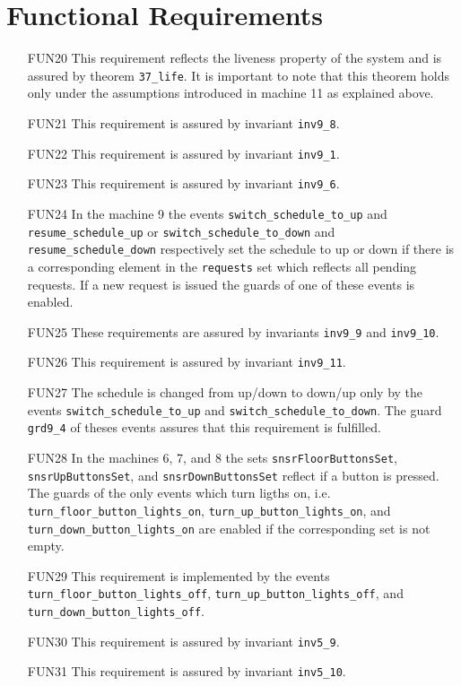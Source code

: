 \documentclass[a4paper,10pt]{article}
\begin{document}
\section{Functional Requirements}
\begin{enumerate}
\item[FUN20] This requirement reflects the liveness property of the system and is assured by theorem {\tt 37\_life}. It is important to note that this theorem holds only under the assumptions introduced in machine 11 as explained above.
\item[FUN21] This requirement is assured by invariant {\tt inv9\_8}.
\item[FUN22] This requirement is assured by invariant {\tt inv9\_1}.
\item[FUN23] This requirement is assured by invariant {\tt inv9\_6}.
\item[FUN24] In the machine 9 the events {\tt switch\_schedule\_to\_up} and {\tt resume\_sched\-ule\_up} or {\tt switch\_schedule\_to\-\_down} and {\tt resume\_schedule\_down} respectively set the schedule to up or down if there is a corresponding element in the {\tt requests} set which reflects all pending requests. If a new request is issued the guards of one of these events is enabled.
\item[FUN25] These requirements are assured by invariants {\tt inv9\_9} and {\tt inv9\_10}.
\item[FUN26] This requirement is assured by invariant {\tt inv9\_11}.
\item[FUN27] The schedule is changed from up/down to down/up only by the events {\tt switch\_schedule\_to\_up} and {\tt switch\_schedule\_to\_down}. The guard {\tt grd9\_4} of theses events assures that this requirement is fulfilled.
\item[FUN28] In the machines 6, 7, and 8 the sets {\tt snsrFloorButtonsSet}, {\tt snsrUpBut\-tonsSet}, and {\tt snsrDownButtonsSet} reflect if a button is pressed. The guards of the only events which turn ligths on, i.e. {\tt turn\_floor\_button\-\_lights\_on}, {\tt turn\_up\_button\_lights\_on}, and {\tt turn\_down\_button\_lights\-\_on} are enabled if the corresponding set is not empty.
\item[FUN29] This requirement is implemented by the events {\tt turn\_floor\_button\_lights\-\_off}, {\tt turn\_up\_button\_lights\-\_off}, and {\tt turn\_down\_button\_lights\-\_off}.
\item[FUN30] This requirement is assured by invariant {\tt inv5\_9}.
\item[FUN31] This requirement is assured by invariant {\tt inv5\_10}.

\end{enumerate}
\end{document}
